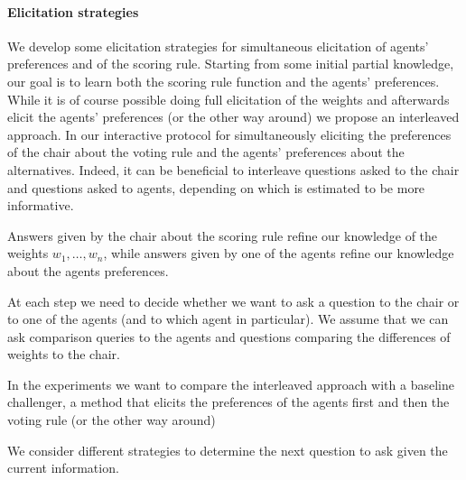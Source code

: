 \paragraph{Elicitation strategies}

We develop some elicitation strategies for simultaneous elicitation of agents' preferences and of the scoring rule.
Starting from some initial partial knowledge, our goal is to learn both the scoring rule function and the agents' preferences.
While it is of course possible doing full elicitation of the weights and afterwards elicit the agents' preferences (or the other way around) we propose an interleaved approach.
In our interactive  protocol for simultaneously eliciting the preferences of the chair about the voting rule and the agents' preferences about the alternatives.
Indeed, it can be beneficial to interleave questions asked to the chair and questions asked to agents, depending on which is estimated to be more informative.

Answers given by the chair about the scoring rule refine our knowledge of the weights $w_1,\ldots,w_n$, while
answers given by one of the agents refine our knowledge about the agents preferences.

At each step we need to decide whether we want to ask a question to the chair or to one of the agents (and to which agent in particular). We assume that we can ask comparison queries to the agents and questions comparing the differences of weights to the chair. 

In the experiments we want to compare the interleaved approach with a baseline challenger, a method  that elicits the preferences of the agents first and then the voting rule (or the other way around)


We consider different strategies to determine the next question to ask given the current information.

